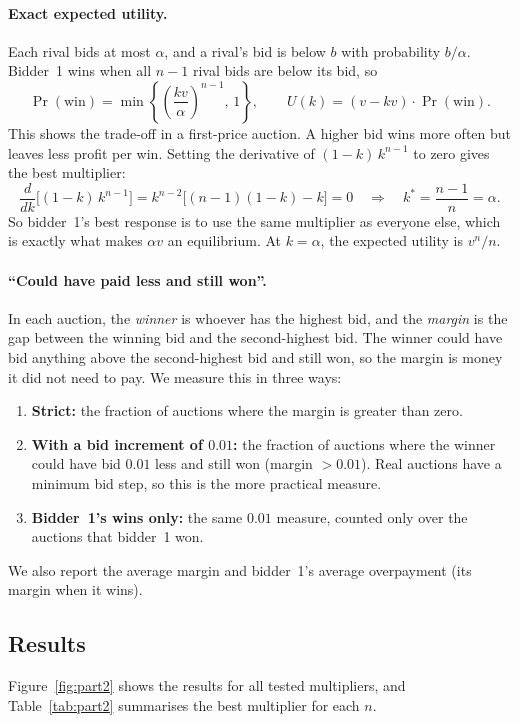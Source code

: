 \documentclass[11pt,a4paper]{article}
\begin{document}
\paragraph{Exact expected utility.} Each rival bids at most $\alpha$, and a rival's bid is below $b$ with probability $b/\alpha$. Bidder~1 wins when all $n-1$ rival bids are below its bid, so
\[
  \Pr(\text{win})=\min\left\{\left(\frac{kv}{\alpha}\right)^{n-1},\,1\right\},
  \qquad
  U(k)=(v-kv)\cdot\Pr(\text{win}).
\]
This shows the trade-off in a first-price auction. A higher bid wins more often but leaves less profit per win. Setting the derivative of $(1-k)\,k^{n-1}$ to zero gives the best multiplier:
\[
  \frac{d}{dk}\Big[(1-k)\,k^{n-1}\Big]=k^{n-2}\big[(n-1)(1-k)-k\big]=0
  \quad\Longrightarrow\quad
  k^*=\frac{n-1}{n}=\alpha.
\]
So bidder~1's best response is to use the same multiplier as everyone else, which is exactly what makes $\alpha v$ an equilibrium. At $k=\alpha$, the expected utility is $v^n/n$.

\paragraph{``Could have paid less and still won''.} In each auction, the \emph{winner} is whoever has the highest bid, and the \emph{margin} is the gap between the winning bid and the second-highest bid. The winner could have bid anything above the second-highest bid and still won, so the margin is money it did not need to pay. We measure this in three ways:
\begin{enumerate}
  \item \textbf{Strict:} the fraction of auctions where the margin is greater than zero.
  \item \textbf{With a bid increment of $0.01$:} the fraction of auctions where the winner could have bid $0.01$ less and still won (margin $>0.01$). Real auctions have a minimum bid step, so this is the more practical measure.
  \item \textbf{Bidder~1's wins only:} the same $0.01$ measure, counted only over the auctions that bidder~1 won.
\end{enumerate}
We also report the average margin and bidder~1's average overpayment (its margin when it wins).

\subsection{Results}

Figure~\ref{fig:part2} shows the results for all tested multipliers, and Table~\ref{tab:part2} summarises the best multiplier for each $n$.
\end{document}
